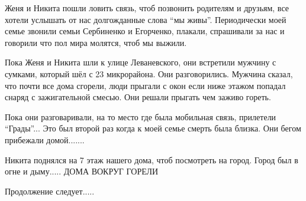 Женя и Никита пошли ловить связь, чтоб позвонить родителям и друзьям, все
хотели услышать от нас долгожданные слова \enquote{мы живы}. Периодически моей семье
звонили семьи Сербиненко и Егорченко, плакали, спрашивали за нас и говорили что
пол мира молятся, чтоб мы выжили. 

Пока Женя и Никита шли к улице  Леваневского, они встретили мужчину с сумками,
который шёл с 23 микрорайона. Они разговорились. Мужчина сказал, что почти все
дома сгорели, люди прыгали с окон если ниже этажом попадал снаряд с
зажигательной смесью. Они решали прыгать чем заживо гореть. 

Пока они разговаривали, на то место где была мобильная связь, прилетели
\enquote{Грады}... Это был второй раз когда к моей семье смерть была близка. Они бегом
прибежали домой.......

Никита поднялся на 7 этаж нашего дома, чтоб посмотреть на город. Город был в
огне и дыму..... ДОМА ВОКРУГ ГОРЕЛИ

Продолжение следует.....

